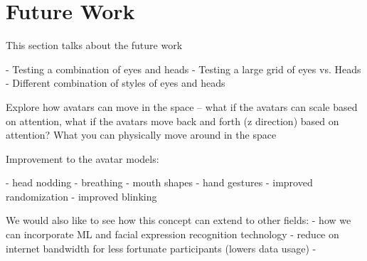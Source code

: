 \section{Future Work}

This section talks about the future work

- Testing a combination of eyes and heads
- Testing a large grid of eyes vs. Heads 
- Different combination of styles of eyes and heads

Explore how avatars can move in the space -- what if the avatars can scale based on attention, what if the avatars move back and forth (z direction) based on attention? What you can physically move around in the space

Improvement to the avatar models:

- head nodding
- breathing
- mouth shapes
- hand gestures
- improved randomization
- improved blinking

We would also like to see how this concept can extend to other fields:
- how we can incorporate ML and facial expression recognition technology
- reduce on internet bandwidth for less fortunate participants (lowers data usage)
- 

